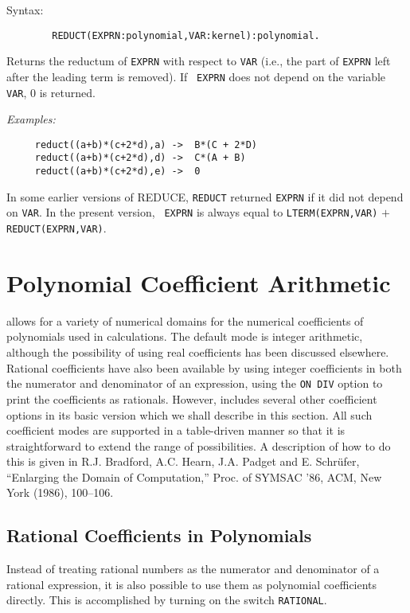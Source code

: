 Syntax:
\begin{verbatim}
        REDUCT(EXPRN:polynomial,VAR:kernel):polynomial.
\end{verbatim}
Returns the reductum of {\tt EXPRN} with respect to {\tt VAR} (i.e., the
part of {\tt EXPRN} left after the leading term is removed).  If {\tt
EXPRN} does not depend on the variable {\tt VAR}, 0 is returned.

{\it Examples:}
\begin{verbatim}
     reduct((a+b)*(c+2*d),a) ->  B*(C + 2*D)
     reduct((a+b)*(c+2*d),d) ->  C*(A + B)
     reduct((a+b)*(c+2*d),e) ->  0
\end{verbatim}

{\COMPATNOTE} In some earlier versions of REDUCE, {\tt REDUCT} returned
{\tt EXPRN} if it did not depend on {\tt VAR}.  In the present version, {\tt
EXPRN} is always equal to {\tt LTERM(EXPRN,VAR)} $+$ {\tt
REDUCT(EXPRN,VAR)}.

\section{Polynomial Coefficient Arithmetic}
{\REDUCE} allows for a variety of numerical domains for the numerical
coefficients of polynomials used in calculations.  The default mode is
integer arithmetic, although the possibility of using real coefficients
 has been discussed elsewhere.  Rational
coefficients have also been available by using integer coefficients in
both the numerator and denominator of an expression, using the {\tt ON
DIV} option to print the coefficients as rationals.
However, {\REDUCE} includes several other coefficient options in its basic
version which we shall describe in this section.  All such coefficient
modes are supported in a table-driven manner so that it is
straightforward to extend the range of possibilities.  A description of
how to do this is given in R.J. Bradford, A.C. Hearn, J.A. Padget and
E. Schr\"ufer, ``Enlarging the {\REDUCE} Domain of Computation,'' Proc. of
SYMSAC '86, ACM, New York (1986), 100--106.

\subsection{Rational Coefficients in Polynomials}
\hypertarget{switch:RATIONAL}{}
Instead of treating rational numbers as the numerator and denominator of a
rational expression, it is also possible to use them as polynomial
coefficients directly. This is accomplished by turning on the switch
{\tt RATIONAL}.

